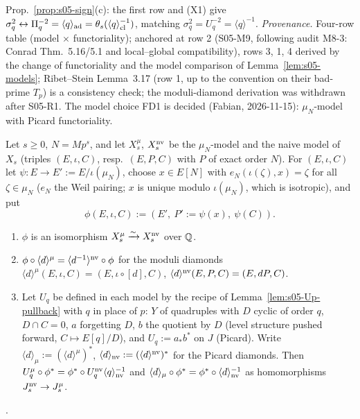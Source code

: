 \begin{remark}
Prop.~\ref{prop:s05-sign}(c): the first row and (X1) give $\sigma_q^2\leftrightarrow\Pi_q^{-2}=\langle q\rangle_{\rm ad}=\theta_s(\langle q\rangle_{\rm cl}^{-1})$,
matching $\sigma_q^2=U_q^{-2}=\langle q\rangle^{-1}$.
\emph{Provenance.} Four-row table (model $\times$ functoriality); anchored at row 2 (S05-M9, following audit M8-3: Conrad Thm.~5.16/5.1 and local--global compatibility), rows 3, 1, 4 derived by the change of functoriality and the model comparison of Lemma~\ref{lem:s05-models}; Ribet--Stein Lemma~3.17 (row 1, up to the convention on their bad-prime $T_p$) is a consistency check; the moduli-diamond derivation was withdrawn after S05-R1. The model choice FD1 is decided (Fabian, 2026-11-15): $\mu_N$-model with Picard functoriality.
\end{remark}

\begin{lemma}\label{lem:s05-models}
Let $s\ge0$, $N=Mp^s$, and let $X^\mu_s$, $X^{\rm nv}_s$ be the $\mu_N$-model and the naive model of $X_s$ (triples $(E,\iota,C)$, resp.\ $(E,P,C)$
with $P$ of exact order $N$). For $(E,\iota,C)$ let $\psi:E\to E':=E/\iota(\mu_N)$, choose $x\in E[N]$ with $e_N(\iota(\zeta),x)=\zeta$ for all
$\zeta\in\mu_N$ ($e_N$ the Weil pairing; $x$ is unique modulo $\iota(\mu_N)$, which is isotropic), and put
\[\phi(E,\iota,C):=(E',\ P':=\psi(x),\ \psi(C)).\]
\begin{enumerate}[label=(\alph*)]
\item $\phi$ is an isomorphism $X^\mu_s\xrightarrow{\sim}X^{\rm nv}_s$ over $\mathbb{Q}$.
\item $\phi\circ\langle d\rangle^\mu=\langle d^{-1}\rangle^{\rm nv}\circ\phi$ for the moduli diamonds $\langle d\rangle^\mu(E,\iota,C)=(E,\iota\circ[d],C)$,
  $\langle d\rangle^{\rm nv}(E,P,C)=(E,dP,C)$.
\item Let $U_q$ be defined in each model by the recipe of Lemma~\ref{lem:s05-Up-pullback} with $q$ in place of $p$: $Y$ of quadruples with
  $D$ cyclic of order $q$, $D\cap C=0$, $a$ forgetting $D$, $b$ the quotient by $D$ (level structure pushed forward, $C\mapsto E[q]/D$), and
  $U_q:=a_*b^*$ on $J$ (Picard). Write $\langle d\rangle_\mu:=(\langle d\rangle^\mu)^*$, $\langle d\rangle_{\rm nv}:=(\langle d\rangle^{\rm nv})^*$ for the Picard diamonds.
  Then $U^\mu_q\circ\phi^*=\phi^*\circ U^{\rm nv}_q\langle q\rangle_{\rm nv}^{-1}$ and $\langle d\rangle_\mu\circ\phi^*=\phi^*\circ\langle d\rangle_{\rm nv}^{-1}$ as homomorphisms
  $J^{\rm nv}_s\to J^\mu_s$.
\end{enumerate}
\stpmc.
\end{lemma}
